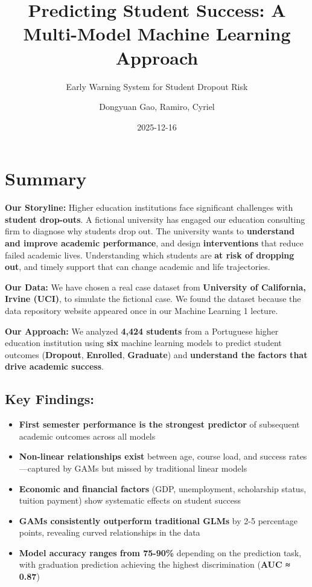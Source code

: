 \documentclass[
]{article}
\title{Predicting Student Success: A Multi-Model Machine Learning
Approach}
\subtitle{Early Warning System for Student Dropout Risk}
\author{Dongyuan Gao, Ramiro, Cyriel}
\date{2025-12-16}
\providecommand{\tightlist}{%
  \setlength{\itemsep}{0pt}\setlength{\parskip}{0pt}}
\begin{document}
\maketitle

\section{Summary}\label{summary}

\textbf{Our Storyline:} Higher education institutions face significant
challenges with \textbf{student drop-outs}. A fictional university has
engaged our education consulting firm to diagnose why students drop out.
The university wants to \textbf{understand and improve academic
performance}, and design \textbf{interventions} that reduce failed
academic lives. Understanding which students are \textbf{at risk of
dropping out}, and timely support that can change academic and life
trajectories.

\textbf{Our Data:} We have chosen a real case dataset from
\textbf{University of California, Irvine (UCI)}, to simulate the
fictional case. We found the dataset because the data repository website
appeared once in our Machine Learning 1 lecture.

\textbf{Our Approach:} We analyzed \textbf{4,424 students} from a
Portuguese higher education institution using \textbf{six} machine
learning models to predict student outcomes (\textbf{Dropout},
\textbf{Enrolled}, \textbf{Graduate}) and \textbf{understand the factors
that drive academic success}.

\subsection{Key Findings:}\label{key-findings}

\begin{itemize}
\tightlist
\item
  \textbf{First semester performance is the strongest predictor} of
  subsequent academic outcomes across all models
\item
  \textbf{Non-linear relationships exist} between age, course load, and
  success rates---captured by GAMs but missed by traditional linear
  models
\item
  \textbf{Economic and financial factors} (GDP, unemployment,
  scholarship status, tuition payment) show systematic effects on
  student success
\item
  \textbf{GAMs consistently outperform traditional GLMs} by 2-5
  percentage points, revealing curved relationships in the data
\item
  \textbf{Model accuracy ranges from 75-90\%} depending on the
  prediction task, with graduation prediction achieving the highest
  discrimination (\textbf{AUC ≈ 0.87})
\end{itemize}
\end{document}
